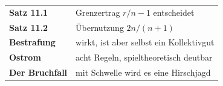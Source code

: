\begin{merksatz}
\begin{center}
\renewcommand{\arraystretch}{1.5}
\begin{tabular}{@{}P{3.0cm}P{5.6cm}@{}}
\toprule
\textbf{Satz 11.1} & Grenzertrag $r/n - 1$ entscheidet\\
\textbf{Satz 11.2} & Übernutzung $2n/(n+1)$\\
\textbf{Bestrafung} & wirkt, ist aber selbst ein Kollektivgut\\
\textbf{Ostrom} & acht Regeln, spieltheoretisch deutbar\\
\textbf{Der Bruchfall} & mit Schwelle wird es eine Hirschjagd\\
\bottomrule
\end{tabular}
\end{center}

\begin{center}
\begin{minipage}{0.88\textwidth}
\end{minipage}
\end{center}
\end{merksatz}
